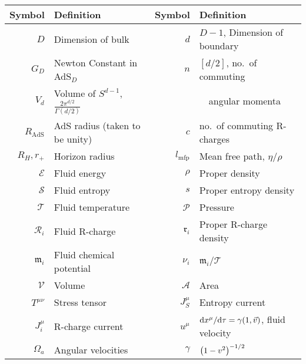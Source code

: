 \documentclass[12pt]{article}
\newcommand{\tloc}{\mathcal{T}}
\newcommand{\floc}{\mathcal{F}}
\newcommand{\eloc}{\mathcal{E}}
\newcommand{\sloc}{\mathcal{S}}
\newcommand{\ploc}{\mathcal{P}}
\newcommand{\rloc}{\mathcal{R}}
\newcommand{\rl}{\mathfrak{r}}
\newcommand{\ml}{\mathfrak{m}}
\begin{document}
\begin{table}
\begin{center}
  \begin{tabular}{||r|l||r|l||}
    \hline
    Symbol & Definition & Symbol & Definition \\
    \hline
    $D$ & Dimension of bulk & $d$ & $D-1$, Dimension of boundary \\
    $G_D$ & Newton Constant in AdS$_D$& $n$ & $[d/2]$,  no.\ of commuting \\
    $V_{d}$ & Volume of $S^{d-1}$, $\frac{2\pi^{d/2}}{\Gamma(d/2)}$ &  & ~~angular momenta \\
    $R_\mathrm{AdS}$ & AdS radius (taken to be unity) & $c$ & no.\ of commuting R-charges \\
    $R_H,r_+$ & Horizon radius & $l_\mathrm{mfp}$ & Mean free path, $\eta /\rho$ \\
    \hline
    $\eloc$ & Fluid energy & $\rho$ & Proper density \\
    $\sloc$ & Fluid entropy & $s$ & Proper entropy density \\
    $\tloc$ & Fluid temperature & $\ploc$ & Pressure \\
    $\rloc_i$ & Fluid R-charge & $\rl_i$ & Proper R-charge density \\
    $\ml_i$ & Fluid chemical potential & $\nu_i$ & $\ml_i/\tloc$ \\
    $\mathcal{V}$ & Volume & $\mathcal{A}$ & Area \\
    \hline
%
    $T^{\mu\nu}$ & Stress tensor & $J^\mu_S$ & Entropy current \\
    $J^\mu_i$ & R-charge current & $u^\mu$ & $\mathrm{d} x^\mu/\mathrm{d}\tau =\gamma(1,\vec{v})$, fluid velocity \\
    $\Omega_a$ & Angular velocities & $\gamma$ & $\left ( 1-v^2 \right )^{-1/2}$ \\

\end{tabular}
\end{center}
\end{table}
\end{document}
